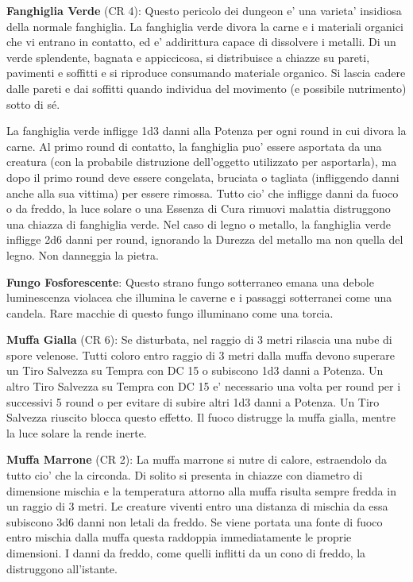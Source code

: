 \documentclass[a4paper,11pt,twoside,openany]{dndbook}
\begin{document}
{\textbf{Fanghiglia Verde} (CR 4): Questo pericolo dei dungeon e' una varieta' insidiosa della normale fanghiglia. La fanghiglia verde divora la carne e i materiali organici che vi entrano in contatto, ed e' addirittura capace di dissolvere i metalli. Di un verde splendente, bagnata e appiccicosa, si distribuisce a chiazze su pareti, pavimenti e soffitti e si riproduce consumando materiale organico. Si lascia cadere dalle pareti e dai soffitti quando individua del movimento (e possibile nutrimento) sotto di sé.

La fanghiglia verde infligge 1d3 danni alla Potenza per ogni round in cui divora la carne. Al primo round di contatto, la fanghiglia puo' essere asportata da una creatura (con la probabile distruzione dell'oggetto utilizzato per asportarla), ma dopo il primo round deve essere congelata, bruciata o tagliata (infliggendo danni anche alla sua vittima) per essere rimossa. Tutto cio' che infligge danni da fuoco o da freddo, la luce solare o una Essenza di Cura rimuovi malattia distruggono una chiazza di fanghiglia verde. Nel caso di legno o metallo, la fanghiglia verde infligge 2d6 danni per round, ignorando la Durezza del metallo ma non quella del legno. Non danneggia la pietra.

\textbf{Fungo Fosforescente}: Questo strano fungo sotterraneo emana una debole luminescenza violacea che illumina le caverne e i passaggi sotterranei come una candela. Rare macchie di questo fungo illuminano come una torcia.

\textbf{Muffa Gialla} (CR 6): Se disturbata, nel raggio di 3 metri rilascia una nube di spore velenose. Tutti coloro entro raggio di 3 metri dalla muffa devono superare un Tiro Salvezza su Tempra con DC 15 o subiscono 1d3 danni a Potenza. Un altro Tiro Salvezza su Tempra con DC 15 e' necessario una volta per round per i successivi 5 round o per evitare di subire altri 1d3 danni a Potenza. Un Tiro Salvezza riuscito blocca questo effetto. Il fuoco distrugge la muffa gialla, mentre la luce solare la rende inerte.

\textbf{Muffa Marrone} (CR 2): La muffa marrone si nutre di calore, estraendolo da tutto cio' che la circonda. Di solito si presenta in chiazze con diametro di dimensione mischia e la temperatura attorno alla muffa risulta sempre fredda in un raggio di 3 metri. Le creature viventi entro una distanza di mischia da essa subiscono 3d6 danni non letali da freddo. Se viene portata una fonte di fuoco entro mischia dalla muffa questa raddoppia immediatamente le proprie dimensioni. I danni da freddo, come quelli inflitti da un cono di freddo, la distruggono all'istante.

}
\end{document}
